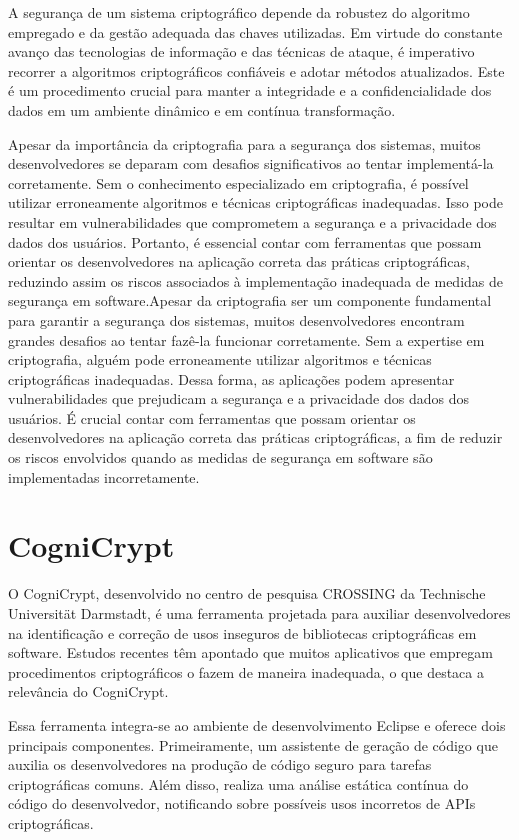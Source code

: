 A segurança de um sistema criptográfico depende da robustez do algoritmo empregado e da gestão adequada das chaves utilizadas. Em virtude do constante avanço das tecnologias de informação e das técnicas de ataque, é imperativo recorrer a algoritmos criptográficos confiáveis e adotar métodos atualizados. Este é um procedimento crucial para manter a integridade e a confidencialidade dos dados em um ambiente dinâmico e em contínua transformação.

Apesar da importância da criptografia para a segurança dos sistemas, muitos desenvolvedores se deparam com desafios significativos ao tentar implementá-la corretamente. Sem o conhecimento especializado em criptografia, é possível utilizar erroneamente algoritmos e técnicas criptográficas inadequadas. Isso pode resultar em vulnerabilidades que comprometem a segurança e a privacidade dos dados dos usuários. Portanto, é essencial contar com ferramentas que possam orientar os desenvolvedores na aplicação correta das práticas criptográficas, reduzindo assim os riscos associados à implementação inadequada de medidas de segurança em software.Apesar da criptografia ser um componente fundamental para garantir a segurança dos sistemas, muitos desenvolvedores encontram grandes desafios ao tentar fazê-la funcionar corretamente. Sem a expertise em criptografia, alguém pode erroneamente utilizar algoritmos e técnicas criptográficas inadequadas. Dessa forma, as aplicações podem apresentar vulnerabilidades que prejudicam a segurança e a privacidade dos dados dos usuários. É crucial contar com ferramentas que possam orientar os desenvolvedores na aplicação correta das práticas criptográficas, a fim de reduzir os riscos envolvidos quando as medidas de segurança em software são implementadas incorretamente.

\section{CogniCrypt} %

O CogniCrypt, desenvolvido no centro de pesquisa CROSSING da Technische Universität Darmstadt, é uma ferramenta projetada para auxiliar desenvolvedores na identificação e correção de usos inseguros de bibliotecas criptográficas em software. Estudos recentes têm apontado que muitos aplicativos que empregam procedimentos criptográficos o fazem de maneira inadequada, o que destaca a relevância do CogniCrypt.

Essa ferramenta integra-se ao ambiente de desenvolvimento Eclipse e oferece dois principais componentes. Primeiramente, um assistente de geração de código que auxilia os desenvolvedores na produção de código seguro para tarefas criptográficas comuns. Além disso, realiza uma análise estática contínua do código do desenvolvedor, notificando sobre possíveis usos incorretos de APIs criptográficas.

